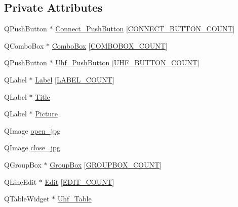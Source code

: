 \subsection*{Private Attributes}
\begin{DoxyCompactItemize}
\item 
Q\+Push\+Button $\ast$ \mbox{\hyperlink{class_widget_a61a0fc24c1e493f10809a38be1672b2f}{Connect\+\_\+\+Push\+Button}} \mbox{[}\mbox{\hyperlink{widget_8h_a8c7377d6ed6b5f2e3d196cda9bd66d91}{C\+O\+N\+N\+E\+C\+T\+\_\+\+B\+U\+T\+T\+O\+N\+\_\+\+C\+O\+U\+NT}}\mbox{]}
\item 
Q\+Combo\+Box $\ast$ \mbox{\hyperlink{class_widget_aa4932b7d383548bd1c3ef9fdc53b77b3}{Combo\+Box}} \mbox{[}\mbox{\hyperlink{widget_8h_a1d2dbe60aded23affb089e8fa1ea345f}{C\+O\+M\+B\+O\+B\+O\+X\+\_\+\+C\+O\+U\+NT}}\mbox{]}
\item 
Q\+Push\+Button $\ast$ \mbox{\hyperlink{class_widget_a240f3ed88e0109b7603a1de958bb46b7}{Uhf\+\_\+\+Push\+Button}} \mbox{[}\mbox{\hyperlink{widget_8h_a5f516bd14ad8c55ba8123f613cb31684}{U\+H\+F\+\_\+\+B\+U\+T\+T\+O\+N\+\_\+\+C\+O\+U\+NT}}\mbox{]}
\item 
Q\+Label $\ast$ \mbox{\hyperlink{class_widget_a93a1c0acd9fea7f804498f1252ff3898}{Label}} \mbox{[}\mbox{\hyperlink{widget_8h_afa6b9ea19a5bb77252217d01e6eb6480}{L\+A\+B\+E\+L\+\_\+\+C\+O\+U\+NT}}\mbox{]}
\item 
Q\+Label $\ast$ \mbox{\hyperlink{class_widget_acc24057b72c6305ca106dd16d67043c8}{Title}}
\item 
Q\+Label $\ast$ \mbox{\hyperlink{class_widget_ae24464daaf56f78d8062a782052f948b}{Picture}}
\item 
Q\+Image \mbox{\hyperlink{class_widget_a5323b8408000a7b387ee208ff0357153}{open\+\_\+jpg}}
\item 
Q\+Image \mbox{\hyperlink{class_widget_affe638630cdef7ba2dc7321939b2594c}{close\+\_\+jpg}}
\item 
Q\+Group\+Box $\ast$ \mbox{\hyperlink{class_widget_a03e14f4e23599c133b82790972e0b817}{Group\+Box}} \mbox{[}\mbox{\hyperlink{widget_8h_a4cac74cc76d2b87cfbeaa86fa5e36d97}{G\+R\+O\+U\+P\+B\+O\+X\+\_\+\+C\+O\+U\+NT}}\mbox{]}
\item 
Q\+Line\+Edit $\ast$ \mbox{\hyperlink{class_widget_a1dc4e69db946e0ef2e0bd804986a9ace}{Edit}} \mbox{[}\mbox{\hyperlink{widget_8h_a68d365c4b44f50a0f879706847801cce}{E\+D\+I\+T\+\_\+\+C\+O\+U\+NT}}\mbox{]}
\item 
Q\+Table\+Widget $\ast$ \mbox{\hyperlink{class_widget_a436eb5e73eae8f0fc48aade2ea4b8419}{Uhf\+\_\+\+Table}}
\item 

\end{DoxyCompactItemize}
